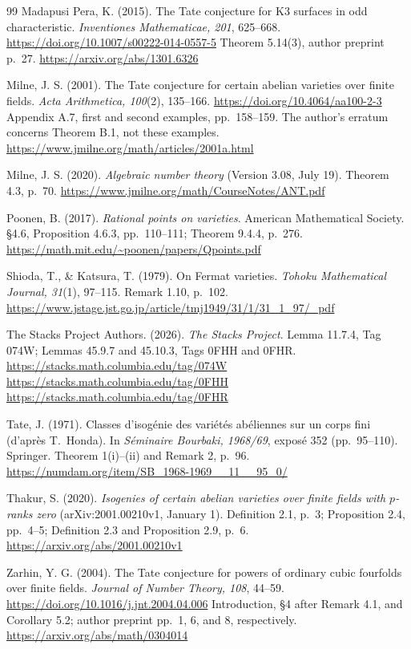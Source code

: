 \documentclass[11pt,a4paper]{article}
\theoremstyle{definition}
\theoremstyle{remark}
\begin{document}
\begin{thebibliography}{99}
Madapusi Pera, K. (2015).
The Tate conjecture for K3 surfaces in odd characteristic.
\emph{Inventiones Mathematicae, 201}, 625--668.
\url{https://doi.org/10.1007/s00222-014-0557-5}
Theorem 5.14(3), author preprint p.~27.
\url{https://arxiv.org/abs/1301.6326}

Milne, J. S. (2001).
The Tate conjecture for certain abelian varieties over finite fields.
\emph{Acta Arithmetica, 100}(2), 135--166.
\url{https://doi.org/10.4064/aa100-2-3}
Appendix A.7, first and second examples, pp.~158--159.
The author's erratum concerns Theorem B.1, not these examples.
\url{https://www.jmilne.org/math/articles/2001a.html}

Milne, J. S. (2020).
\emph{Algebraic number theory} (Version 3.08, July 19).
Theorem 4.3, p.~70.
\url{https://www.jmilne.org/math/CourseNotes/ANT.pdf}

Poonen, B. (2017).
\emph{Rational points on varieties}. American Mathematical Society.
\S4.6, Proposition 4.6.3, pp.~110--111;
Theorem 9.4.4, p.~276.
\url{https://math.mit.edu/~poonen/papers/Qpoints.pdf}

Shioda, T., \& Katsura, T. (1979).
On Fermat varieties.
\emph{Tohoku Mathematical Journal, 31}(1), 97--115.
Remark 1.10, p.~102.
\url{https://www.jstage.jst.go.jp/article/tmj1949/31/1/31_1_97/_pdf}

The Stacks Project Authors. (2026).
\emph{The Stacks Project}. Lemma 11.7.4, Tag 074W;
Lemmas 45.9.7 and 45.10.3, Tags 0FHH and 0FHR.
\url{https://stacks.math.columbia.edu/tag/074W}
\url{https://stacks.math.columbia.edu/tag/0FHH}
\url{https://stacks.math.columbia.edu/tag/0FHR}

Tate, J. (1971).
Classes d'isog\'enie des vari\'et\'es ab\'eliennes sur un corps fini
(d'apr\`es T.~Honda).
In \emph{S\'eminaire Bourbaki, 1968/69}, expos\'e 352
(pp.~95--110). Springer.
Theorem 1(i)--(ii) and Remark 2, p.~96.
\url{https://numdam.org/item/SB_1968-1969__11__95_0/}

Thakur, S. (2020).
\emph{Isogenies of certain abelian varieties over finite fields with
$p$-ranks zero} (arXiv:2001.00210v1, January 1).
Definition 2.1, p.~3; Proposition 2.4, pp.~4--5;
Definition 2.3 and Proposition 2.9, p.~6.
\url{https://arxiv.org/abs/2001.00210v1}

Zarhin, Y. G. (2004).
The Tate conjecture for powers of ordinary cubic fourfolds over
finite fields.
\emph{Journal of Number Theory, 108}, 44--59.
\url{https://doi.org/10.1016/j.jnt.2004.04.006}
Introduction, \S4 after Remark 4.1, and Corollary 5.2;
author preprint pp.~1, 6, and 8, respectively.
\url{https://arxiv.org/abs/math/0304014}

\end{thebibliography}
\end{document}
